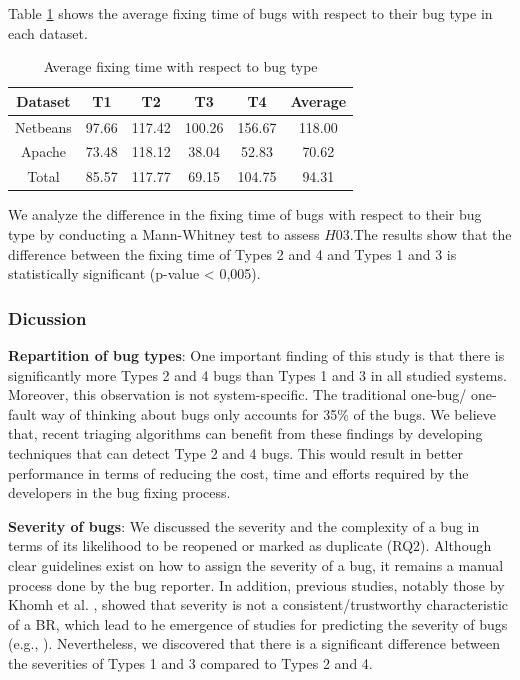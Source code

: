 Table \ref{tab:bug-taxo-rq3} shows the average fixing time of bugs with respect
to their bug type in each dataset.

\begin{table}[h!]
\centering
\begin{tabular}{c|c|c|c|c|c}
Dataset  & T1    & T2     & T3     & T4     & Average \\ \hline \hline
Netbeans & 97.66 & 117.42 & 100.26 & 156.67 & 118.00  \\ \hline
Apache   & 73.48 & 118.12 & 38.04  & 52.83  & 70.62   \\ \hline
Total    & 85.57 & 117.77 & 69.15  & 104.75 & 94.31  \\ \hline \hline
\end{tabular}
\caption{Average fixing time with respect to bug type
    \label{tab:bug-taxo-rq3}}
\end{table}

We analyze the difference in the fixing time of bugs with
respect to their bug type by conducting a Mann-Whitney test
to assess $H03$.The results show that the difference between
the fixing time of Types 2 and 4 and Types 1 and 3 is
statistically significant (p-value < 0,005).

\noindent{}

\subsubsection{Dicussion}

{\bf Repartition of bug types}: One important finding of this
study is that there is significantly more Types 2 and 4 bugs
than Types 1 and 3 in all studied systems. Moreover, this
observation is not system-specific. The traditional one-bug/
one-fault way of thinking about bugs only accounts for 35\%
of the bugs. We believe that, recent triaging algorithms
\cite{Jalbert2008,Jeong2009,Khomh2011a,Tamrawi2011a} can benefit from these findings by developing
techniques that can detect Type 2 and 4 bugs. This would
result in better performance in terms of reducing the cost,
time and efforts required by the developers in the bug fixing
process.

{\bf Severity of bugs}: We discussed the severity and the
complexity of a bug in terms of its likelihood to be reopened
or marked as duplicate (RQ2). Although clear guidelines exist
on how to assign the severity of a bug, it remains a manual
process done by the bug reporter. In addition, previous
studies, notably those by Khomh et al. \cite{Khomh2011a}, showed that severity is not a consistent/trustworthy characteristic of a BR,
which lead to he emergence of studies for predicting the
severity of bugs (e.g., \cite{Lamkanfi2010,Lamkanfi2011,Tian2012}). Nevertheless, we
discovered that there is a significant difference between the
severities of Types 1 and 3 compared to Types 2 and 4.

